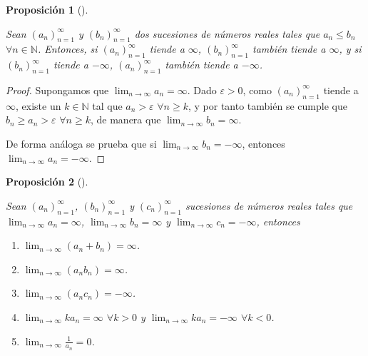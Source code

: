 \documentclass[
  a4paper,
]{scrreport}
\providecommand{\tightlist}{%
  \setlength{\itemsep}{0pt}\setlength{\parskip}{0pt}}\usepackage{longtable,booktabs,array}
\theoremstyle{definition}
\theoremstyle{plain}
\theoremstyle{definition}
\theoremstyle{definition}
\theoremstyle{plain}
\theoremstyle{plain}
\newtheorem{proposition}{Proposición}[chapter]
\theoremstyle{remark}
\begin{document}
\begin{proposition}[]\protect\hypertarget{prp-sucesiones-propiamentes-divergentes}{}\label{prp-sucesiones-propiamentes-divergentes}

Sean \((a_n)_{n=1}^\infty\) y \((b_n)_{n=1}^\infty\) dos sucesiones de
números reales tales que \(a_n\leq b_n\) \(\forall n\in\mathbb{N}\).
Entonces, si \((a_n)_{n=1}^\infty\) tiende a \(\infty\),
\((b_n)_{n=1}^\infty\) también tiende a \(\infty\), y si
\((b_n)_{n=1}^\infty\) tiende a \(-\infty\), \((a_n)_{n=1}^\infty\)
también tiende a \(-\infty\).

\end{proposition}

\begin{tcolorbox}[enhanced jigsaw, leftrule=.75mm, colbacktitle=quarto-callout-note-color!10!white, toprule=.15mm, opacityback=0, opacitybacktitle=0.6, toptitle=1mm, breakable, bottomtitle=1mm, colframe=quarto-callout-note-color-frame, rightrule=.15mm, titlerule=0mm, title=\textcolor{quarto-callout-note-color}{\faInfo}\hspace{0.5em}{Demostración}, arc=.35mm, left=2mm, bottomrule=.15mm, colback=white, coltitle=black]

\begin{proof}
Supongamos que \(\lim_{n\to\infty}a_n=\infty\). Dado \(\varepsilon>0\),
como \((a_n)_{n=1}^\infty\) tiende a \(\infty\), existe un
\(k\in\mathbb{N}\) tal que \(a_n>\varepsilon\) \(\forall n\geq k\), y
por tanto también se cumple que \(b_n\geq a_n>\varepsilon\)
\(\forall n\geq k\), de manera que \(\lim_{n\to\infty}b_n=\infty\).

De forma análoga se prueba que si \(\lim_{n\to\infty}b_n=-\infty\),
entonces \(\lim_{n\to\infty}a_n=-\infty\).
\end{proof}

\end{tcolorbox}

\begin{proposition}[]\protect\hypertarget{prp-algebra-sucesiones-propiamentes-divergentes}{}\label{prp-algebra-sucesiones-propiamentes-divergentes}

Sean \((a_n)_{n=1}^\infty\), \((b_n)_{n=1}^\infty\) y
\((c_n)_{n=1}^\infty\) sucesiones de números reales tales que
\(\lim_{n\to\infty}a_n=\infty\), \(\lim_{n\to\infty}b_n=\infty\) y
\(\lim_{n\to\infty}c_n=-\infty\), entonces

\begin{enumerate}
\def\labelenumi{\alph{enumi}.}
\tightlist
\item
  \(\lim_{n\to\infty}(a_n+b_n)=\infty\).
\item
  \(\lim_{n\to\infty}(a_nb_n)=\infty\).
\item
  \(\lim_{n\to\infty}(a_nc_n)=-\infty\).
\item
  \(\lim_{n\to\infty}ka_n=\infty\) \(\forall k>0\) y
  \(\lim_{n\to\infty}ka_n=-\infty\) \(\forall k<0\).
\item
  \(\lim_{n\to\infty}\frac{1}{a_n}=0\).
\end{enumerate}

\end{proposition}
\end{document}
